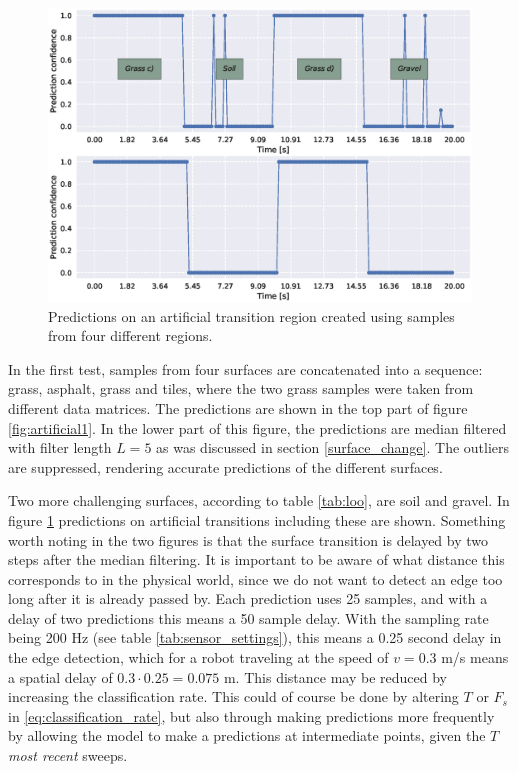 \begin{figure}[t]
	\centering
	\includegraphics[scale=0.5]{figs_temp/varmats2}
	\caption{Predictions on an artificial transition region created using samples from four different regions.}
	\label{fig:artificial2}
\end{figure}

In the first test, samples from four surfaces are concatenated into a sequence: grass, asphalt, grass and tiles, where the two grass samples were taken from different data matrices. The predictions are shown in the top part of figure \ref{fig:artificial1}. In the lower part of this figure, the predictions are median filtered with filter length $L=5$ as was discussed in section \ref{surface_change}. The outliers are suppressed, rendering accurate predictions of the different surfaces. 

Two more challenging surfaces, according to table \ref{tab:loo}, are soil and gravel. In figure \ref{fig:artificial2} predictions on artificial transitions including these are shown. Something worth noting in the two figures is that the surface transition is delayed by two steps after the median filtering. It is important to be aware of what distance this corresponds to in the physical world, since we do not want to detect an edge too long after it is already passed by. Each prediction uses 25 samples, and with a delay of two predictions this means a 50 sample delay. With the sampling rate being 200 Hz (see table \ref{tab:sensor_settings}), this means a 0.25 second delay in the edge detection, which for a robot traveling at the speed of $v=0.3$ m/s means a spatial delay of $0.3\cdot0.25=0.075$ m. This distance may be reduced by increasing the classification rate. This could of course be done by altering $T$ or $F_s$ in \eqref{eq:classification_rate}, but also through making predictions more frequently by allowing the model to make a predictions at intermediate points, given the $T$ \emph{most recent} sweeps.

